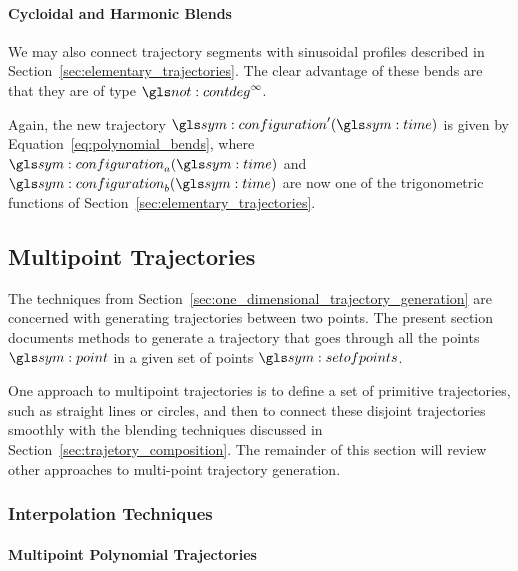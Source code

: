 
			\paragraph{Cycloidal and Harmonic Blends}%
			\label{cycloidal_and_harmonic_blends}

				We may also connect trajectory segments with sinusoidal
				profiles described in Section~\ref{sec:elementary_trajectories}.
				The clear advantage of these bends are that they are of type
				$\contdeg{\infty}$.

				Again, the new trajectory $\configuration'(\timesym)$ is given
				by Equation~\ref{eq:polynomial_bends}, where
				$\configuration_a(\timesym)$ and $\configuration_b(\timesym)$
				are now one of the trigonometric functions of
				Section~\ref{sec:elementary_trajectories}.

	\subsection{Multipoint Trajectories}%
	\label{sec:multipoint_trajectories}

		The techniques from
		Section~\ref{sec:one_dimensional_trajectory_generation} are concerned
		with generating trajectories between two points. The present section
		documents methods to generate a trajectory that goes through all the
		points $\point$ in a given set of points $\setofpoints$.


		One approach to multipoint trajectories is to define a set of primitive
		trajectories, such as straight lines or circles, and then to connect
		these disjoint trajectories smoothly with the blending techniques
		discussed in Section~\ref{sec:trajetory_composition}. The remainder of
		this section will review other approaches to multi-point trajectory
		generation.

		\subsubsection{Interpolation Techniques}%
		\label{sec:interpolation_techniques}

			\paragraph{Multipoint Polynomial Trajectories}%
			\label{sec:multipoint_polynomial_trajectories}


